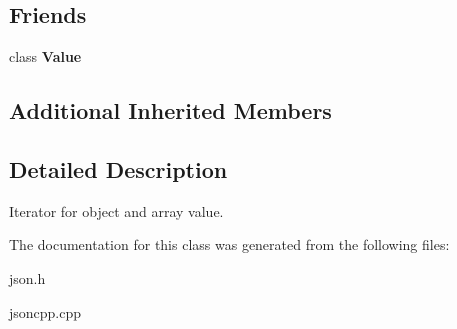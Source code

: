 \subsection*{Friends}
\begin{DoxyCompactItemize}
\item 
\hypertarget{class_json_1_1_value_iterator_aeceedf6e1a7d48a588516ce2b1983d6f}{class {\bfseries Value}}\label{class_json_1_1_value_iterator_aeceedf6e1a7d48a588516ce2b1983d6f}

\end{DoxyCompactItemize}
\subsection*{Additional Inherited Members}


\subsection{Detailed Description}
Iterator for object and array value. 

The documentation for this class was generated from the following files\-:\begin{DoxyCompactItemize}
\item 
json.\-h\item 
jsoncpp.\-cpp\end{DoxyCompactItemize}
